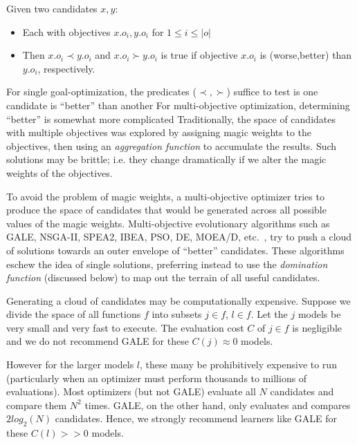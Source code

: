 \documentclass[10pt,journal,compsoc]{IEEEtran}
\newcommand{\bi}{\begin{itemize}}
\newcommand{\ei}{\end{itemize}}
\begin{document}
Given two candidates $x,y$:
\bi
\item Each with objectives $x.o_i,y.o_i$ for
$1 \le i \le \rvert o \rvert $
\item Then 
$ x.o_i \prec y.o_i$ and 
$ x.o_i \succ y.o_i$ 
is true if   objective  $x.o_i$ is (worse,better) than $y.o_i$, respectively.
\ei
For single goal-optimization, the predicates
($\prec,\succ$) suffice to test is one candidate is ``better'' than another
For multi-objective optimization, determining ``better''  is somewhat more complicated 
Traditionally, the space of candidates with multiple
objectives was explored by assigning magic weights to the objectives, then using an {\em aggregation function} to accumulate the results. 
Such solutions may be  brittle; i.e. they change dramatically if we alter the magic weights of the objectives.  

To avoid the problem of magic weights, a multi-objective optimizer tries to produce the space of candidates that would be generated across all possible values of the magic weights.
Multi-objective evolutionary algorithms such as GALE, NSGA-II, SPEA2, IBEA, PSO, DE, MOEA/D, etc.~\cite{deb00afast,zit02,Zitzler04indicator-basedselection,Poli07particleswarm,585892,zhang07}, try to push a cloud of solutions towards an outer envelope of ``better'' candidates.
These algorithms eschew the idea of single solutions, preferring instead to use the {\em domination function} (discussed below) to map out the terrain of all useful candidates.

Generating a cloud of candidates may  be computationally
expensive. 
Suppose we divide 
the space of all functions  $f$ into subsets
$j \in f$,  $l \in f$. 
Let the  $j$ models be  very small and very  fast to execute.
The   evaluation cost $C$  of $j \in f$  is negligible
and we do not recommend GALE for these $C(j)\approx0$ models.

However for the larger models $l$, these many be 
prohibitively expensive to run
(particularly when
an optimizer must perform thousands to millions of evaluations).
Most optimizers (but not GALE) evaluate all $N$ candidates
and compare them $N^2$ times. GALE, on the other hand,
only evaluates and compares $2log_2(N)$ candidates. Hence,
we strongly
recommend  learners like GALE for these $C(l)>>0$ models.
\end{document}
